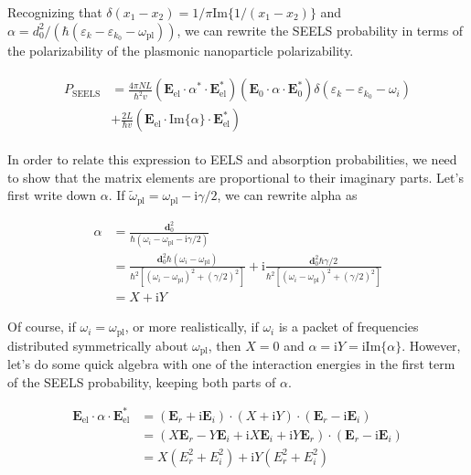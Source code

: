 \documentclass [11pt, proquest] {uwthesis}[2016/11/22]
\begin{document}
Recognizing that $\delta(x_1 - x_2) = 1/\pi\textrm{Im}\{1/(x_1-x_2)\}$ and $\alpha = d_0^2/(\hbar(\varepsilon_k-\varepsilon_{k_0}-\omega_{\textrm{pl}}))$, we can rewrite the SEELS probability in terms of the polarizability of the plasmonic nanoparticle polarizability.

\begin{align}
\begin{split}
  P_{\textrm{SEELS}} &= \frac{4\pi NL}{\hbar^2v}(\textbf{E}_{\textrm{el}}\cdot\alpha^*\cdot\textbf{E}_{\textrm{el}}^*)(\textbf{E}_0\cdot\alpha\cdot\textbf{E}_0^*)\delta(\varepsilon_k - \varepsilon_{k_0}-\omega_i)\\
  &+ \frac{2L}{\hbar v}(\textbf{E}_{\textrm{el}}\cdot\textrm{Im}\{\alpha\}\cdot\textbf{E}_{\textrm{el}}^*)
  \end{split}
\end{align}

In order to relate this expression to EELS and absorption probabilities, we need to show that the matrix elements are proportional to their imaginary parts. Let's first write down $\alpha$. If $\tilde{\omega}_{\textrm{pl}} = \omega_{\textrm{pl}} - \textrm{i}\gamma/2$, we can rewrite alpha as

\begin{equation}
\begin{aligned}
\alpha &= \frac{\textbf{d}_0^2}{\hbar(\omega_i - \omega_{\textrm{pl}} - \textrm{i}\gamma/2)}\\
& = \frac{\textbf{d}_0^2\hbar (\omega_i - \omega_{\textrm{pl}})}{\hbar^2[(\omega_i - \omega_{\textrm{pl}})^2 + (\gamma/2)^2]} + \textrm{i}\frac{\textbf{d}_0^2\hbar\gamma/2}{\hbar^2[(\omega_i - \omega_{\textrm{pl}})^2 + (\gamma/2)^2]}\\
& = X + \textrm{i}Y
\end{aligned}
\end{equation}

Of course, if $\omega_i = \omega_{\textrm{pl}}$, or more realistically, if $\omega_i$ is a packet of frequencies distributed symmetrically about $\omega_{\textrm{pl}}$, then $X=0$ and $\alpha = \textrm{i}Y = \textrm{i}\textrm{Im}\{\alpha\}$. However, let's do some quick algebra with one of the interaction energies in the first term of the SEELS probability, keeping both parts of $\alpha$.

\begin{equation}
\begin{aligned}
\textbf{E}_{\textrm{el}}\cdot\alpha\cdot\textbf{E}_{\textrm{el}}^* &= (\textbf{E}_r+\textrm{i}\textbf{E}_i)\cdot(X+\textrm{i}Y)\cdot(\textbf{E}_r-\textrm{i}\textbf{E}_i)\\
& = (X\textbf{E}_r - Y\textbf{E}_i + \textrm{i}X\textbf{E}_i + \textrm{i}Y\textbf{E}_r)\cdot(\textbf{E}_r-\textrm{i}\textbf{E}_i)\\
& = X(E_r^2 + E_i^2) + \textrm{i}Y(E_r^2 + E_i^2)
\end{aligned}
\end{equation}
\end{document}
